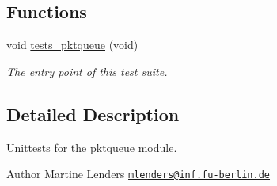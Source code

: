 \subsection*{Functions}
\begin{DoxyCompactItemize}
\item 
void \hyperlink{group__unittests_ga01dc5c2a2dd69c690d952cd6e233cf60}{tests\+\_\+pktqueue} (void)
\begin{DoxyCompactList}\small\item\em The entry point of this test suite. \end{DoxyCompactList}\end{DoxyCompactItemize}


\subsection{Detailed Description}
Unittests for the {\ttfamily pktqueue} module. 

\begin{DoxyAuthor}{Author}
Martine Lenders \href{mailto:mlenders@inf.fu-berlin.de}{\tt mlenders@inf.\+fu-\/berlin.\+de} 
\end{DoxyAuthor}
